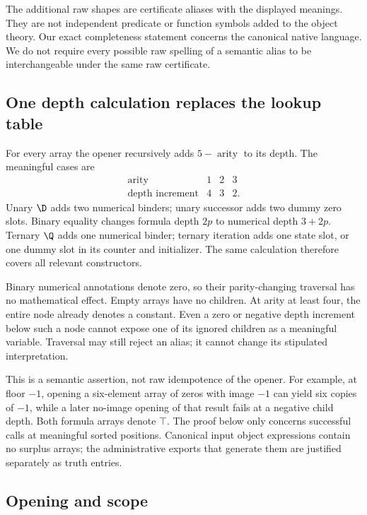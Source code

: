 The additional raw shapes are certificate aliases with the displayed
meanings.  They are not independent predicate or function symbols added
to the object theory.  Our exact completeness statement concerns the
canonical native language.  We do not require every possible raw spelling
of a semantic alias to be interchangeable under the same raw certificate.

\subsection{One depth calculation replaces the lookup table}

For every array the opener recursively adds $5-\operatorname{arity}$
to its depth.  The meaningful cases are
\[
\begin{array}{c|ccc}
 \operatorname{arity}&1&2&3\\\hline
 \text{depth increment}&4&3&2.
\end{array}
\]
Unary $\D$ adds two numerical binders; unary successor adds two dummy
zero slots.  Binary equality changes formula depth $2p$ to numerical
depth $3+2p$.  Ternary $\Q$ adds one numerical binder; ternary iteration
adds one state slot, or one dummy slot in its counter and initializer.
The same calculation therefore covers all relevant constructors.

Binary numerical annotations denote zero, so their parity-changing
traversal has no mathematical effect.  Empty arrays have no children.
At arity at least four, the entire node already denotes a constant.
Even a zero or negative depth increment below such a node cannot expose
one of its ignored children as a meaningful variable.  Traversal may
still reject an alias; it cannot change its stipulated interpretation.

This is a semantic assertion, not raw idempotence of the opener.
For example, at floor $-1$, opening a six-element array of zeros with
image $-1$ can yield six copies of $-1$, while a later no-image opening
of that result fails at a negative child depth.  Both formula arrays
denote $\top$.  The proof below only concerns successful calls at meaningful
sorted positions.  Canonical input object expressions contain no surplus
arrays; the administrative exports that generate them are justified
separately as truth entries.

\subsection{Opening and scope}
\label{subsec:opening-lemma}

